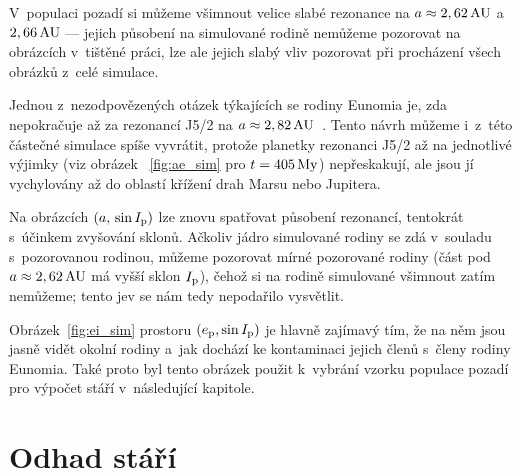 \documentclass[A4paper, 12pt, oneside, openany]{book}
\begin{document}
V~populaci pozadí si můžeme všimnout velice slabé rezonance na $a\approx2,62\,{\rm AU}$ a~$2,66\,{\rm AU}$ --- jejich působení na simulované rodině nemůžeme pozorovat na obrázcích v~tištěné práci, lze ale jejich slabý vliv pozorovat při procházení všech obrázků z~celé simulace.

Jednou z~nezodpovězených otázek týkajících se rodiny Eunomia je, zda nepokračuje až za rezonancí J5/2 na $a\approx2,82\,{\rm AU}$~\cite{nesvorny15}. Tento návrh můžeme i~z~této částečné simulace spíše vyvrátit, protože planetky rezonanci J5/2 až na jednotlivé výjimky (viz obrázek ~\ref{fig:ae_sim} pro $t=405\,{\rm My}$) nepřeskakují, ale jsou jí vychylovány až do oblastí křížení drah Marsu nebo Jupitera.

Na obrázcích $(a,\,\sin I_{\rm p})$ lze znovu spatřovat působení rezonancí, tentokrát s~účinkem zvyšování sklonů. Ačkoliv jádro simulované rodiny se zdá v~souladu s~pozorovanou rodinou, můžeme pozorovat mírné  pozorované rodiny (část pod $a\approx2,62\,{\rm AU}$ má vyšší sklon $I_{\rm p}$), čehož si na rodině simulované všimnout zatím nemůžeme; tento jev se nám tedy nepodařilo vysvětlit.

Obrázek~\ref{fig:ei_sim} prostoru $(e_{\rm p},\sin I_{\rm p})$ je hlavně zajímavý tím, že na něm jsou jasně vidět okolní rodiny a~jak dochází ke kontaminaci jejich členů s~členy rodiny Eunomia. Také proto byl tento obrázek použit k~vybrání vzorku populace pozadí pro výpočet stáří v~následující kapitole.

\newpage
\section{Odhad stáří}
\end{document}
